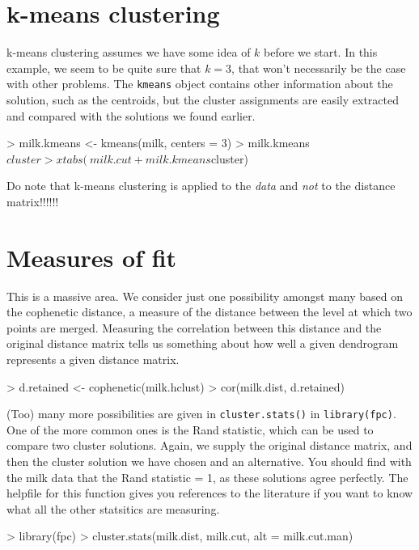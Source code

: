 \documentclass[11pt]{article}
\begin{document}
\section{k-means clustering}

k-means clustering assumes we have some idea of $k$ before we start.   In this example, we seem to be quite sure that $k=3$, that won't necessarily be the case with other problems.   The \texttt{kmeans} object contains other information about the solution, such as the centroids, but the cluster assignments are easily extracted and compared with the solutions we found earlier.

\begin{Schunk}
\begin{Sinput}
> milk.kmeans <- kmeans(milk, centers = 3)
> milk.kmeans$cluster
> xtabs(~milk.cut+milk.kmeans$cluster)
\end{Sinput}
\end{Schunk}

Do note that k-means clustering is applied to the \emph{data} and \emph{not} to the distance matrix!!!!!!

\section{Measures of fit}

This is a massive area.   We consider just one possibility amongst many based on the cophenetic distance, a measure of the distance between the level at which two points are merged.   Measuring the correlation between this distance and the original distance matrix tells us something about how well a given dendrogram represents a given distance matrix.

\begin{Schunk}
\begin{Sinput}
> d.retained <- cophenetic(milk.hclust)
> cor(milk.dist, d.retained)
\end{Sinput}
\end{Schunk}

(Too) many more possibilities are given in \texttt{cluster.stats()} in \texttt{library(fpc)}.   One of the more common ones is the Rand statistic, which can be used to compare two cluster solutions.   Again, we supply the original distance matrix, and then the cluster solution we have chosen and an alternative.   You should find with the milk data that the Rand statistic = 1, as these solutions agree perfectly.  The helpfile for this function gives you references to the literature if you want to know what all the other statsitics are measuring.

\begin{Schunk}
\begin{Sinput}
> library(fpc)
> cluster.stats(milk.dist, milk.cut, alt = milk.cut.man)
\end{Sinput}
\end{Schunk}
\end{document}
